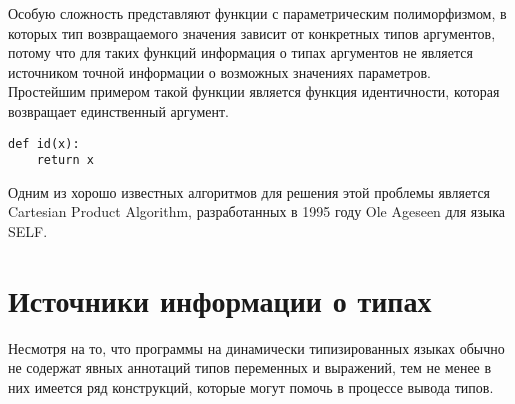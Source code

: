 Особую сложность представляют функции с параметрическим полиморфизмом, в
которых тип возвращаемого значения зависит от конкретных типов аргументов, 
потому что для таких функций информация о типах аргументов не является
источником точной информации о возможных значениях параметров.
Простейшим примером такой функции является функция идентичности,
которая возвращает единственный аргумент.

\begin{lstlisting}
def id(x):
    return x
\end{lstlisting}

Одним из хорошо известных алгоритмов для решения этой проблемы является 
Cartesian Product Algorithm, разработанных в 1995 году Ole Ageseen для языка
SELF.



\section{Источники информации о типах}
\label{sec:type-sources}


Несмотря на то, что программы на динамически типизированных языках обычно не
содержат явных аннотаций типов переменных и выражений, тем не менее в них
имеется ряд конструкций, которые могут помочь в процессе вывода типов. 

